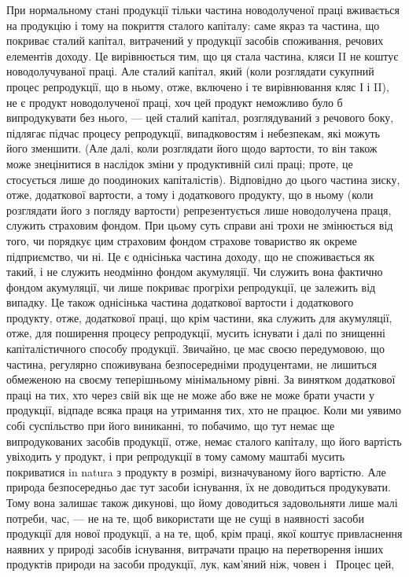 При нормальному стані продукції тільки частина новодолученої праці
вживається на продукцію і тому на покриття сталого капіталу: саме якраз та
частина, що покриває сталий капітал, витрачений у продукції засобів споживання,
речових елементів доходу. Це вирівнюється тим, що ця стала частина,
кляси II не коштує новодолучуваної праці. Але сталий капітал, який (коли розглядати
сукупний процес репродукції, що в ньому, отже, включено і те вирівнювання
кляс І і II), не є продукт новодолученої праці, хоч цей продукт неможливо
було б випродукувати без нього, — цей сталий капітал, розглядуваний з речового
боку, підлягає підчас процесу репродукції, випадковостям і небезпекам,
які можуть його зменшити. (Але далі, коли розглядати його щодо вартости, то
він також може знецінитися в наслідок зміни у продуктивній силі праці;
проте, це стосується лише до поодиноких капіталістів). Відповідно до цього частина
зиску, отже, додаткової вартости, а тому і додаткового продукту, що в ньому
(коли розглядати його з погляду вартости) репрезентується лише новодолучена
праця, служить страховим фондом. При цьому суть справи ані трохи не змінюється
від того, чи порядкує цим страховим фондом страхове товариство як
окреме підприємство, чи ні. Це є однісінька частина доходу, що не споживається
як такий, і не служить неодмінно фондом акумуляції. Чи служить вона фактично
фондом акумуляції, чи лише покриває прогріхи репродукції, це залежить від
випадку. Це також однісінька частина додаткової вартости і додаткового продукту,
отже, додаткової праці, що крім частини, яка служить для акумуляції, отже,
для поширення процесу репродукції, мусить існувати і далі по знищенні
капіталістичного способу продукції. Звичайно, це має своєю передумовою, що
частина, регулярно споживувана безпосередніми продуцентами, не лишиться обмеженою на своєму
теперішньому мінімальному рівні. За винятком додаткової
праці на тих, хто через свій вік ще не може або вже не може брати участи у продукції,
відпаде всяка праця на утримання тих, хто не працює. Коли ми уявимо
собі суспільство при його виниканні, то побачимо, що тут немає ще випродукованих
засобів продукції, отже, немає сталого капіталу, що його вартість увіходить
у продукт, і при репродукції в тому самому маштабі мусить покриватися
in natura з продукту в розмірі, визначуваному його вартістю. Але природа
безпосередньо дає тут засоби існування, їх не доводиться продукувати. Тому
вона залишає також дикунові, що йому доводиться задовольняти лише малі потреби,
час, — не на те, щоб використати ще не сущі в наявності засоби продукції для
нової продукції, а на те, щоб, крім праці, якої коштує привласнення наявних
у природі засобів існування, витрачати працю на перетворення інших продуктів
природи на засоби продукції, лук, кам’яний ніж, човен і~ Процес цей,
\parbreak{}  %
